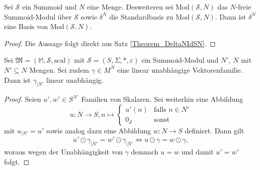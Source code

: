\documentclass{article}
\begin{document}
\begin{theorem}
  Sei $\mathcal{S}$ ein Summoid und
  $N$ eine Menge. Desweiteren sei
  $\text{Mod}(\mathcal{S}, N)$ das $N$-freie Summoid-Modul über $\mathcal{S}$ sowie
  $\delta^N$ die Standardbasis zu $\text{Mod}(\mathcal{S}, N)$.
  Dann ist $\delta^N$ eine Basis von $\text{Mod}(\mathcal{S}, N)$.
\end{theorem}
\begin{proof}
  Die Aussage folgt direkt aus Satz \ref{Theorem_DeltaNIdSN}.
\end{proof}

\begin{lemma}\label{Lemma_UnabhEinschr}
  Sei $\mathfrak{M} = (\mathbb{M}, \mathcal{S}, \text{scal})$
  mit $\mathcal{S} = (S, \Sigma, \ast, \varepsilon)$ ein Summoid-Modul
  und $N'$, $N$ mit $N' \subseteq N$ Mengen.
  Sei zudem $\gamma \in M^N$ eine linear unabhängige Vektorenfamilie.
  Dann ist $\gamma_{\mid N'}$ linear unabhängig.
\end{lemma}
\begin{proof}
  Seien $u', w' \in S^{N'}$ Familien von Skalaren.
  Sei weiterhin eine Abbildung
  \begin{equation*}
    u \colon N \to S, n \mapsto
    \begin{cases}
      u'(n) & \text{falls } n \in N' \\
      0_\mathcal{S} & \text{sonst}
    \end{cases}
  \end{equation*}
  mit $u_{\mid N'} = u'$ sowie analog dazu eine Abbildung $w \colon N \to S$ definiert.
  Dann gilt
  \begin{equation*}
    u' \odot \gamma_{\mid N'} = w' \odot \gamma_{\mid N'} \iff u \odot \gamma = w \odot \gamma,
  \end{equation*}
  woraus wegen der Unabhängigkeit von $\gamma$ demnach $u = w$ und damit $u' = w'$ folgt.
\end{proof}
\end{document}
